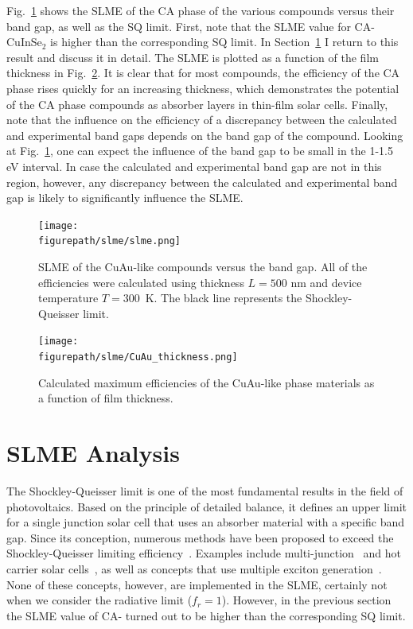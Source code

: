 \begin{refsection}
  
Fig.~\ref{slme:fig-SLME} shows the SLME of the CA phase of the various 
compounds versus their band gap, as well as the SQ limit. First, note 
that the SLME value for \mbox{CA-CuInSe$_2$} is higher than the 
corresponding SQ limit. In Section~\ref{slme:sec-analysis} I return to this 
result and discuss it in detail. The SLME is plotted as a function of the film 
thickness in Fig.~\ref{slme:fig-SLME_CuAu_L}. It is clear that for most 
compounds, the efficiency of the CA phase rises quickly for an increasing 
thickness, which demonstrates the potential of the CA phase compounds as 
absorber layers in thin-film solar cells. Finally, note that the influence on the efficiency of a 
discrepancy between the calculated and experimental band gaps depends on the band 
gap of the compound.
Looking at Fig.~\ref{slme:fig-SLME}, one can expect the 
influence of the band gap to be small in the 1-1.5 \si{\electronvolt} 
interval. In case the calculated and experimental band gap are not in this 
region, however, any discrepancy between the calculated and experimental band 
gap is likely to significantly influence the SLME. 

\begin{figure}[ht]
\centering
\captionsetup{width=0.9\textwidth}
\texttt{[image: \\figurepath/slme/slme.png]} 
\caption{SLME of the CuAu-like compounds versus the band gap. All of the 
efficiencies were calculated using thickness $L = 500$ \si{\nano\meter} and 
device temperature $T = 300$~\si{\kelvin}. The black line represents the 
Shockley-Queisser limit.} 
\label{slme:fig-SLME} 
\end{figure} 

\begin{figure}[ht] 
\centering 
\captionsetup{width=0.9\textwidth}
\texttt{[image: \\figurepath/slme/CuAu\_thickness.png]} 
\caption{Calculated maximum efficiencies of the CuAu-like phase materials as 
a function of film thickness.} 
\label{slme:fig-SLME_CuAu_L} 
\end{figure} 
 
\section{SLME Analysis} \label{slme:sec-analysis} 
 
The Shockley-Queisser limit is one of the most fundamental results in the 
field of photovoltaics. Based on the principle of detailed balance, it defines 
an upper limit for a single junction solar cell that uses an absorber material 
with a specific band gap. Since its conception, numerous methods have been 
proposed to exceed the Shockley-Queisser limiting 
efficiency~\cite{Nelson2013}. Examples include multi-junction~\cite{Shah2004, 
Heremans2009} and hot carrier solar cells~\cite{Konig2010}, as well as 
concepts that use multiple exciton generation~\cite{Hanna2006}. None of these 
concepts, however, are implemented in the SLME, certainly not when we consider 
the radiative limit ($f_r = 1$). However, in the previous section the SLME 
value of CA- turned out to be higher than the corresponding SQ limit. 


\end{refsection}

